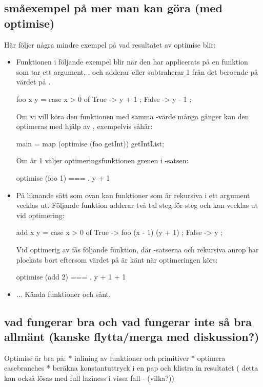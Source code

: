 \documentclass[Rapport]{subfiles}
\begin{document}
\subsection{småexempel på mer man kan göra (med optimise)} 

Här följer några mindre exempel på vad resultatet av optimise blir:

\begin{itemize}
\item Funktionen  i följande exempel blir när den har applicerats på 
en funktion som tar ett argument, , och adderar eller subtraherar 1 från
det beroende på värdet på .

\begin{codeEx}
foo x y = case x > 0 of
    { True  -> y + 1
    ; False -> y - 1
    };
\end{codeEx}
Om vi vill köra den funktionen med samma -värde många gånger kan den optimeras
med hjälp av , exempelvis såhär:
\begin{codeEx}
main = map (optimise (foo getInt)) getIntList;
\end{codeEx}
Om  är 1 väljer optimeringsfunktionen grenen  i -satsen:
\begin{codeEx}
optimise (foo 1) === \y . y + 1
\end{codeEx}

\item På liknande sätt som ovan kan funktioner som är rekursiva i ett argument
vecklas ut. Följande funktion adderar två tal steg för steg och kan vecklas ut
vid optimering:

\begin{codeEx}
add x y = case x > 0 of
    { True  -> foo (x - 1) (y + 1)
    ; False -> y
    };
\end{codeEx}

Vid optimerig av  fås följande funktion, där -satserna och 
rekursiva anrop har plockats bort eftersom värdet på  är känt när
optimeringen körs:

\begin{codeEx}
optimise (add 2) === \y . y + 1 + 1
\end{codeEx}

\item ... Kända funktioner och sånt.

\end{itemize}

\subsection{vad fungerar bra och vad fungerar inte så bra allmänt (kanske flytta/merga med diskussion?)}
Optimise är bra på:
    * inlining av funktioner och primitiver
    * optimera casebranches
    * beräkna konstantuttryck i en pap och klistra in resultatet
             ( detta kan också lösas med full laziness i vissa fall - (vilka?))
\end{document}
